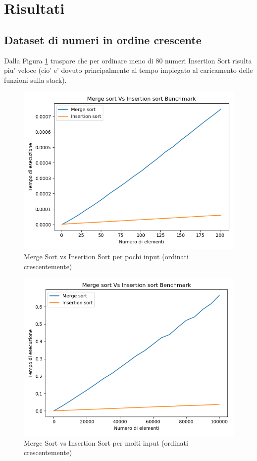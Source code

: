 \documentclass[a4paper]{article}
\begin{document}
\newpage
\section{Risultati}
\subsection{Dataset di numeri in ordine crescente}
Dalla Figura \ref{fig:SmallInsMergeCresc} traspare che per ordinare meno di 80 numeri Insertion Sort risulta piu' veloce (cio' e' dovuto principalmente al tempo impiegato al caricamento delle funzioni sulla stack).	

 
		\begin{figure}[!htb]
		\centering
		\includegraphics[scale=0.3]{2}
		\caption{Merge Sort vs Insertion Sort per pochi input (ordinati crescentemente)}
		\label{fig:SmallInsMergeCresc}
		\end{figure}
		
		\begin{figure}[!htb]
		\centering
		\includegraphics[scale=0.3]{1}
		\caption{Merge Sort vs Insertion Sort per molti input (ordinati crescentemente)}
		\label{fig:BigInsMergeCresc}
		\end{figure}
		
\end{document}
